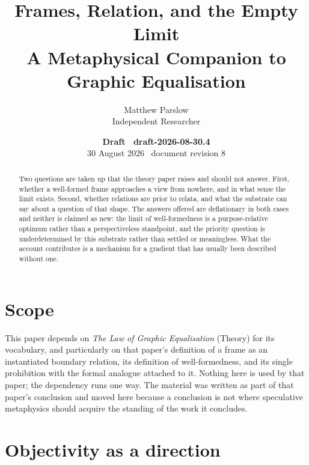\documentclass[11pt,a4paper]{article}
\title{Frames, Relation, and the Empty Limit\\\large A Metaphysical Companion to Graphic Equalisation}
\author{Matthew Parslow\\Independent Researcher}
\date{\textbf{Draft \textemdash\ draft-2026-08-30.4}\\[2pt]30 August 2026 \textbullet\ document revision 8}
\theoremstyle{remark}\newtheorem{remark}[definition]{Remark}
\begin{document}
\maketitle
\begin{center}
\end{center}
\vspace{1em}

\begin{abstract}
Two questions are taken up that the theory paper raises and should not answer. First, whether a
well-formed frame approaches a view from nowhere, and in what sense the limit exists. Second, whether
relations are prior to relata, and what the substrate can say about a question of that shape. The
answers offered are deflationary in both cases and neither is claimed as new: the limit of
well-formedness is a purpose-relative optimum rather than a perspectiveless standpoint, and the
priority question is underdetermined by this substrate rather than settled or meaningless. What the
account contributes is a mechanism for a gradient that has usually been described without one.
\end{abstract}

\section{Scope}\label{sec:scope}
This paper depends on \emph{The Law of Graphic Equalisation} (Theory) for its vocabulary, and
particularly on that paper's definition of a frame as an instantiated boundary relation, its
definition of well-formedness, and its single prohibition with the formal analogue attached to it.
Nothing here is used by that paper; the dependency runs one way. The material was written as part of
that paper's conclusion and moved here because a conclusion is not where speculative metaphysics
should acquire the standing of the work it concludes.

\section{Objectivity as a direction}\label{sec:direction}
\end{document}
